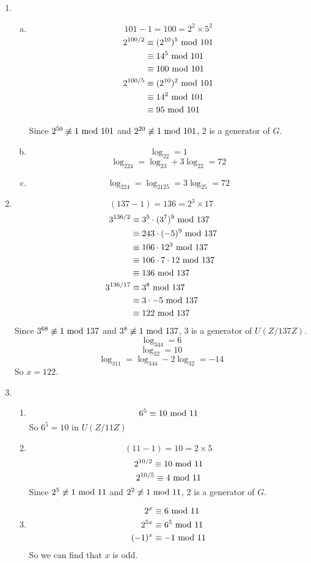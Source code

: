 \documentclass{article}
\renewcommand{\mod}{{\rm\ mod\ }}
\begin{document}
\begin{enumerate}
\item
\begin{enumerate}[(a)]
\item
$$101-1=100=2^2\times5^2$$
\begin{align*}
2^{100/2}&\equiv(2^{10})^5\mod 101\\
&\equiv14^5\mod 101\\
&\equiv100\mod 101\\
2^{100/5}&\equiv(2^{10})^2\mod 101\\
&\equiv14^2\mod 101\\
&\equiv95\mod 101
\end{align*}

Since $2^{50}\not\equiv1\mod101$ and $2^{20}\not\equiv1\mod101$, 2 is a generator of $G$.
\item
$$\log_22=1$$
$$\log_224=\log_23+3\log_22=72$$
\item
$$\log_224=\log_2125=3\log_25=72$$
\end{enumerate}

\item
$$(137-1)=136=2^3\times17$$
\begin{align*}
3^{136/2}&\equiv3^5\cdot(3^{7})^9\mod 137\\
&\equiv243\cdot(-5)^9\mod 137\\
&\equiv106\cdot12^3\mod 137\\
&\equiv106\cdot7\cdot12\mod 137\\
&\equiv136\mod 137\\
3^{136/17}&\equiv3^8\mod 137\\
&\equiv3\cdot-5\mod 137\\
&\equiv122\mod 137
\end{align*}
Since $3^{68}\not\equiv1\mod 137$ and $3^{8}\not\equiv1\mod 137$, 3 is a generator of $U(Z/137Z)$.\\
$$\log_344=6$$
$$\log_32=10$$
$$\log_311=\log_344-2\log_32=-14$$
So $x=122$.
\item
\begin{enumerate}
\item
$$6^5\equiv10\mod11$$
So $6^5=10$ in $U(Z/11Z)$
\item
$$(11-1)=10=2\times5$$
$$2^{10/2}\equiv10\mod 11$$
$$2^{10/5}\equiv4\mod 11$$
Since $2^{5}\not\equiv1\mod11$ and $2^{2}\not\equiv1\mod11$, 2 is a generator of $G$.
\item
\begin{align*}
2^x&\equiv6\mod 11\\
2^{5x}&\equiv6^5\mod 11\\
(-1)^x&\equiv-1\mod 11
\end{align*}
So we can find that $x$ is odd.
\end{enumerate}
\end{enumerate}
\end{document}
